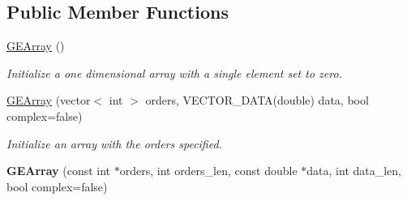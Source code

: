 \subsection*{Public Member Functions}
\begin{DoxyCompactItemize}
\item 
\hypertarget{class_g_e_array_a59934816e881cf01fb22d08f1d8fc1e0}{\hyperlink{class_g_e_array_a59934816e881cf01fb22d08f1d8fc1e0}{G\-E\-Array} ()}\label{class_g_e_array_a59934816e881cf01fb22d08f1d8fc1e0}

\begin{DoxyCompactList}\small\item\em Initialize a one dimensional array with a single element set to zero. \end{DoxyCompactList}\item 
\hyperlink{class_g_e_array_a99e59c84b9ee6288030cda2fecc116af}{G\-E\-Array} (vector$<$ int $>$ orders, V\-E\-C\-T\-O\-R\-\_\-\-D\-A\-T\-A(double) data, bool complex=false)
\begin{DoxyCompactList}\small\item\em Initialize an array with the orders specified. \end{DoxyCompactList}\item 
\hypertarget{class_g_e_array_aff83dc2b4d74f050eff84e360a8df3c9}{{\bfseries G\-E\-Array} (const int $\ast$orders, int orders\-\_\-len, const double $\ast$data, int data\-\_\-len, bool complex=false)}\label{class_g_e_array_aff83dc2b4d74f050eff84e360a8df3c9}


\end{DoxyCompactItemize}
